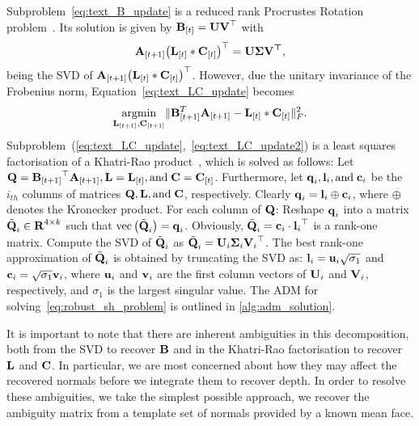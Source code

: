 { %
\def\t#1{{\bb{#1}_{[t]}}}
\def\tp#1{{\bb{#1}_{[t+1]}}}
\noindent Subproblem~\eqref{eq:text_B_update} is a reduced rank Procrustes
Rotation problem~\cite{RefWorks:327}. Its solution is given by
$\boldsymbol{\mathbf{B}}_{[t]} = \boldsymbol{\mathbf{U}} \boldsymbol{\mathbf{V}}^{\top}$ with
\begin{equation}\label{eq:text_B_update2}
    \tp A {\left(\t L \ast \t C\right)}^{\top} = \bb{U} \bb{\Sigma} \bb{V^{\top}},
\end{equation} 
being the SVD of $\tp A {\left(\t L \ast \t C\right)}^{\top}$. However, due the
unitary invariance of the Frobenius norm, Equation~\ref{eq:text_LC_update}
becomes
\begin{equation}\label{eq:text_LC_update2}
    \argmin_{\bb{L}_{[t+1]}, \bb{C}_{[t+1]}} \lVert \bb{B}_{[t+1]}^T\bb{A}_{[t+1]} - \bb{L}_{[t]} \ast \bb{C}_{[t]} \rVert_{F}^{2}.
\end{equation}
Subproblem~(\ref{eq:text_LC_update},~\ref{eq:text_LC_update2}) is a least 
squares factorisation of a Khatri-Rao product~\cite{Roemer:2010iv}, which is 
solved as follows:
Let $\bb{Q} = \tp B^{\top} \tp A, \bb{L} = \t L, \text{and} \; \bb{C} = \t C$. 
Furthermore, let $\boldsymbol{\mathbf{q}}_i, \boldsymbol{\mathbf{l}}_i, \text{and} \; \boldsymbol{\mathbf{c}}_i$ be the $i_{th}$ 
columns of 
matrices $\boldsymbol{\mathbf{Q}}, \boldsymbol{\mathbf{L}}, \text{and} \; \boldsymbol{\mathbf{C}}$, respectively. 
Clearly $\boldsymbol{\mathbf{q}}_i = \boldsymbol{\mathbf{l}}_i \oplus \boldsymbol{\mathbf{c}}_i$, where $\oplus$ denotes the Kronecker 
product. For each column of $\boldsymbol{\mathbf{Q}}$: Reshape $\boldsymbol{\mathbf{q}}_i$ into a 
matrix $\tilde{\boldsymbol{\mathbf{Q}}}_i \in \boldsymbol{\mathbf{R}}^{4 \times k}$ 
such that 
$\text{vec}\left(\tilde{\boldsymbol{\mathbf{Q}}}_i\right) = \boldsymbol{\mathbf{q}}_i$. 
Obviously, $\tilde{\boldsymbol{\mathbf{Q}}}_i = \boldsymbol{\mathbf{c}}_i \cdot {\boldsymbol{\mathbf{l}}_i}^{\top}$ is a rank-one matrix.
Compute the SVD of
$\tilde{\boldsymbol{\mathbf{Q}}}_i$ as $\tilde{\boldsymbol{\mathbf{Q}}}_i = \boldsymbol{\mathbf{U}}_i \boldsymbol{\mathbf{\Sigma}}_i {\boldsymbol{\mathbf{V}}_i}^{\top}$. 
The best rank-one approximation of $\tilde{\boldsymbol{\mathbf{Q}}}_i$ is obtained by truncating the SVD as:
$\boldsymbol{\mathbf{l}}_i = \boldsymbol{\mathbf{u}}_i \sqrt{\sigma_1}$ and $\boldsymbol{\mathbf{c}}_i = \sqrt{\sigma_1} \boldsymbol{\mathbf{v}}_i$,
where $\boldsymbol{\mathbf{u}}_i$ and $\boldsymbol{\mathbf{v}}_i$ are the first column vectors of $\boldsymbol{\mathbf{U}}_i$
and $\boldsymbol{\mathbf{V}}_i$, respectively, and $\sigma_1$ is the largest singular value.
The ADM for solving~\eqref{eq:robust_sh_problem} is outlined in 
\cref{alg:adm_solution}.
}

It is important to note that there are inherent ambiguities in this
decomposition, both from the SVD to recover $\boldsymbol{\mathbf{B}}$ and in the Khatri-Rao
factorisation to recover $\boldsymbol{\mathbf{L}}$ and $\boldsymbol{\mathbf{C}}$. In particular, we are most
concerned about how they may affect the recovered normals before we integrate
them to recover depth. In order to resolve these ambiguities, we take the
simplest possible approach, we recover the ambiguity matrix from a template set
of normals provided by a known mean face.

